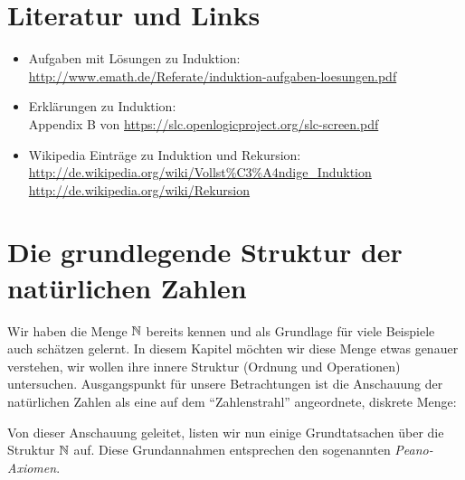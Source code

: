 \section*{Literatur und Links}
\begin{itemize}
\item Aufgaben mit Lösungen zu Induktion:\\ \url{http://www.emath.de/Referate/induktion-aufgaben-loesungen.pdf}
\item Erklärungen zu Induktion:\\
Appendix B von \url{https://slc.openlogicproject.org/slc-screen.pdf}
\item Wikipedia Einträge zu Induktion und Rekursion:\\
\url{http://de.wikipedia.org/wiki/Vollst%C3%A4ndige_Induktion}\\
\url{http://de.wikipedia.org/wiki/Rekursion}
\end{itemize}


\section{Die grundlegende Struktur der natürlichen Zahlen}
Wir haben die Menge $\mathbb{N}$ bereits kennen und als Grundlage für viele Beispiele auch schätzen gelernt. In diesem Kapitel möchten wir diese Menge etwas genauer verstehen, wir wollen ihre innere Struktur (Ordnung und Operationen) untersuchen. Ausgangspunkt für unsere Betrachtungen ist die Anschauung der natürlichen Zahlen als eine auf dem ``Zahlenstrahl'' angeordnete, diskrete Menge:

\begin{center}
\end{center}

 Von dieser Anschauung geleitet, listen wir nun einige Grundtatsachen über die Struktur $\mathbb{N}$ auf. Diese Grundannahmen entsprechen den sogenannten \textit{Peano-Axiomen}.

